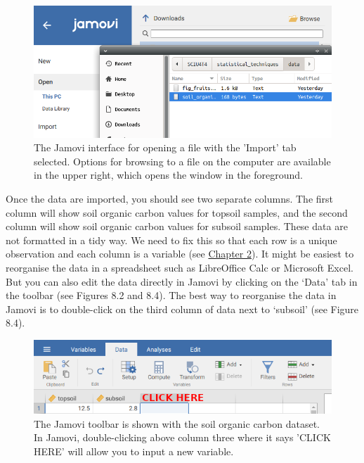 \documentclass[
]{scrbook}
\begin{document}
\begin{figure}
\includegraphics[width=1\linewidth]{img/open_soil_organic_carbon} \caption{The Jamovi interface for opening a file with the 'Import' tab selected. Options for browsing to a file on the computer are available in the upper right, which opens the window in the foreground.}\label{fig:unnamed-chunk-26}
\end{figure}

Once the data are imported, you should see two separate columns.
The first column will show soil organic carbon values for topsoil samples, and the second column will show soil organic carbon values for subsoil samples.
These data are not formatted in a tidy way.
We need to fix this so that each row is a unique observation and each column is a variable (see \protect\hyperlink{Chapter_2}{Chapter 2}).
It might be easiest to reorganise the data in a spreadsheet such as LibreOffice Calc or Microsoft Excel.
But you can also edit the data directly in Jamovi by clicking on the `Data' tab in the toolbar (see Figures 8.2 and 8.4).
The best way to reorganise the data in Jamovi is to double-click on the third column of data next to `subsoil' (see Figure 8.4).

\begin{figure}
\includegraphics[width=1\linewidth]{img/jamovi_new_variable} \caption{The Jamovi toolbar is shown with the soil organic carbon dataset. In Jamovi, double-clicking above column three where it says 'CLICK HERE' will allow you to input a new variable.}\label{fig:unnamed-chunk-27}
\end{figure}
\end{document}
